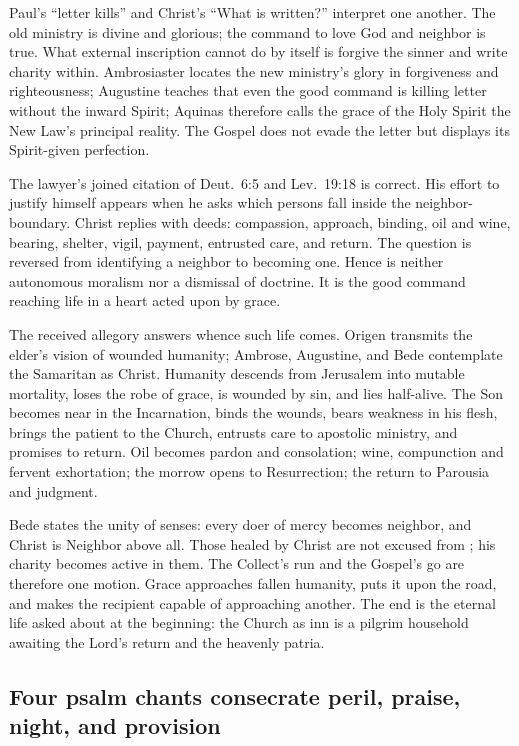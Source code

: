 Paul's ``letter kills'' and Christ's ``What is written?'' interpret one another.
The old ministry is divine and glorious; the command to love God and neighbor
is true. What external inscription cannot do by itself is forgive the sinner
and write charity within. Ambrosiaster locates the new ministry's glory in
forgiveness and righteousness; Augustine teaches that even the good command is
killing letter without the inward Spirit; Aquinas therefore calls the grace of
the Holy Spirit the New Law's principal reality. The Gospel does not evade the
letter but displays its Spirit-given perfection.

The lawyer's joined citation of Deut.~6:5 and Lev.~19:18 is correct. His effort
to justify himself appears when he asks which persons fall inside the
neighbor-boundary. Christ replies with deeds: compassion, approach, binding,
oil and wine, bearing, shelter, vigil, payment, entrusted care, and return. The
question is reversed from identifying a neighbor to becoming one. Hence
 is neither autonomous moralism nor a dismissal of
doctrine. It is the good command reaching life in a heart acted upon by grace.

The received allegory answers whence such life comes. Origen transmits the
elder's vision of wounded humanity; Ambrose, Augustine, and Bede contemplate
the Samaritan as Christ. Humanity descends from Jerusalem into mutable
mortality, loses the robe of grace, is wounded by sin, and lies half-alive.
The Son becomes near in the Incarnation, binds the wounds, bears weakness in
his flesh, brings the patient to the Church, entrusts care to apostolic
ministry, and promises to return. Oil becomes pardon and consolation; wine,
compunction and fervent exhortation; the morrow opens to Resurrection; the
return to Parousia and judgment.

Bede states the unity of senses: every doer of mercy becomes neighbor, and
Christ is Neighbor above all. Those healed by Christ are not excused from
; his charity becomes active in them. The Collect's run
and the Gospel's go are therefore one motion. Grace approaches fallen humanity,
puts it upon the road, and makes the recipient capable of approaching another.
The end is the eternal life asked about at the beginning: the Church as inn is
a pilgrim household awaiting the Lord's return and the heavenly patria.

\subsection*{Four psalm chants consecrate peril, praise, night, and provision \enspace{}}

